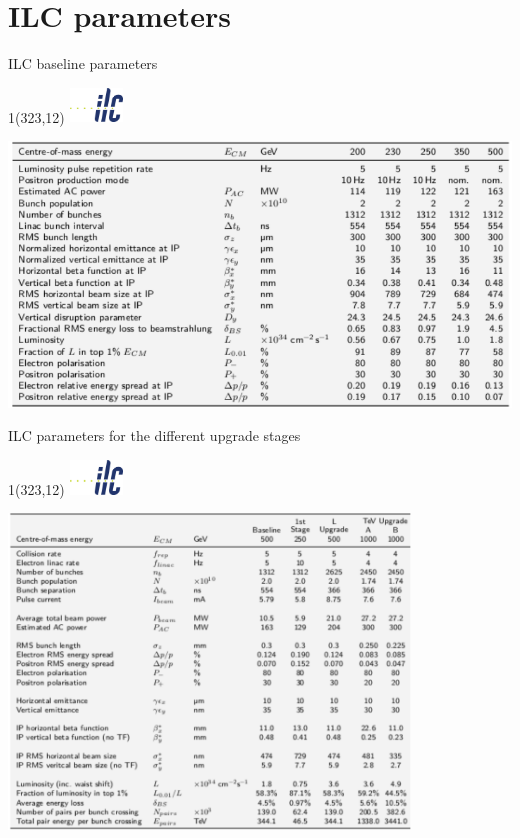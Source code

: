 \documentclass[xcolor={dvipsnames}]{beamer}
\newcommand{\ilclogo}{
  \setlength{\TPHorizModule}{1pt}
  \setlength{\TPVertModule}{1pt}
  \begin{textblock}{1}(323,12)
   \includegraphics[width=40pt,height=26pt]{figures/ILC.jpeg}
  \end{textblock}
}
\begin{document}
\section{ILC parameters}
\begin{frame}{ILC baseline parameters}
\ilclogo
\centering
	\includegraphics[width=\textwidth]{figures/ILCTDR-VOLUME_3-PART_II_ILCparameters.pdf}
\end{frame}
\begin{frame}{ILC parameters for the different upgrade stages}
\ilclogo
\centering
	\includegraphics[width=0.8\textwidth]{figures/ILCTDR-VOLUME_3-PART_II_ILCparametersUpgrades.pdf}
\end{frame}
\end{document}
